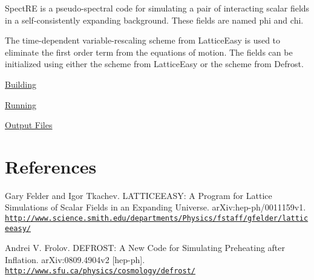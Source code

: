 SpectRE is a pseudo-\/spectral code for simulating a pair of interacting scalar fields in a self-\/consistently expanding background. These fields are named phi and chi.

\begin{DoxyParagraph}{}
The time-\/dependent variable-\/rescaling scheme from LatticeEasy is used to eliminate the first order term from the equations of motion. The fields can be initialized using either the scheme from LatticeEasy or the scheme from Defrost.
\end{DoxyParagraph}
\begin{DoxyItemize}
\item \hyperlink{building}{Building} \item \hyperlink{running}{Running} \item \hyperlink{outputs}{Output Files}\end{DoxyItemize}
\hypertarget{index_refs}{}\section{References}\label{index_refs}
\begin{DoxyItemize}
\item Gary Felder and Igor Tkachev. LATTICEEASY: A Program for Lattice Simulations of Scalar Fields in an Expanding Universe. arXiv:hep-\/ph/0011159v1. \href{http://www.science.smith.edu/departments/Physics/fstaff/gfelder/latticeeasy/}{\tt http://www.science.smith.edu/departments/Physics/fstaff/gfelder/latticeeasy/} \item Andrei V. Frolov. DEFROST: A New Code for Simulating Preheating after Inflation. arXiv:0809.4904v2 \mbox{[}hep-\/ph\mbox{]}. \href{http://www.sfu.ca/physics/cosmology/defrost/}{\tt http://www.sfu.ca/physics/cosmology/defrost/} \end{DoxyItemize}
